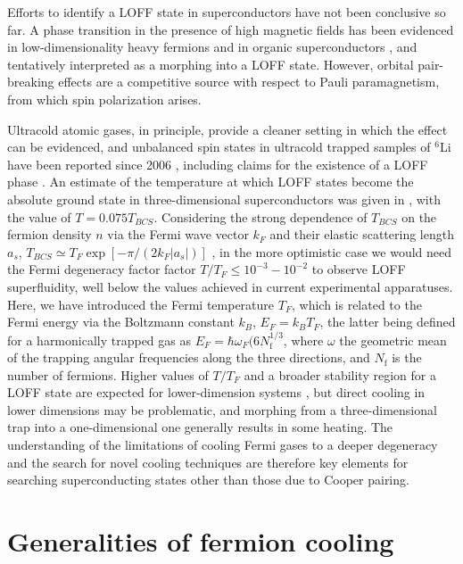 \documentclass[pra,letterpaper,twocolumn,showpacs,superscriptaddress]{revtex4}
\begin{document}
Efforts to identify a LOFF state in superconductors have not been conclusive so far. A phase transition in the presence of high magnetic fields has  
been evidenced in low-dimensionality heavy fermions \cite{Gloos1993,Radovan2003,Kakuyanagi2005} and in organic superconductors 
\cite{Dupuis1995}, and tentatively interpreted as a morphing into a LOFF state. However, orbital pair-breaking effects are a competitive source with respect to Pauli 
paramagnetism, from which spin polarization arises. 

Ultracold atomic gases, in principle, provide a cleaner setting in which the effect can be evidenced, and 
unbalanced spin states in ultracold trapped samples of ${}^6$Li have been reported since 2006 \cite{Zwierlein2006,Partridge2006}, including claims for 
the existence of a LOFF phase \cite{Liao2010}. An estimate of the temperature at which LOFF states become the absolute ground state in 
three-dimensional superconductors was given in \cite{Matsuo1998}, with the value of $T = 0.075 T_{BCS}$. Considering the strong dependence of 
$T_{BCS}$ on the fermion density $n$ via the Fermi wave vector $k_F$ and their elastic scattering length $a_s$, $T_{BCS} \simeq T_F \exp[-\pi/(2k_F|a_s|)]$ 
\cite{Gorkov1961,Stoof1996},  in the more optimistic case we would need the Fermi degeneracy factor factor $T/T_F \leq 10^{-3}-10^{-2}$ to observe LOFF superfluidity, 
well below the values achieved in current experimental apparatuses. Here, we have introduced the Fermi temperature $T_F$, which is related to the Fermi energy 
via the Boltzmann constant $k_B$, $E_F=k_B T_F$, the latter being defined for a harmonically trapped gas as 
$E_F=\hbar \omega_F (6N_\mathrm{f}^{1/3}$, where $\omega$ the geometric mean of the trapping angular frequencies along the three directions, and 
$N_\mathrm{f}$ is the number of fermions. Higher values of $T/T_F$ and a broader stability region for a LOFF state are expected for 
lower-dimension systems \cite{Liu2007,Yanase2009}, but direct cooling in lower dimensions may be problematic, and morphing from a 
three-dimensional trap into a one-dimensional one generally results in some heating. The understanding of the limitations of cooling Fermi gases to a 
deeper degeneracy and the search for novel cooling techniques are therefore key elements for searching superconducting states other than those due to Cooper pairing. 

\section{\bf{Generalities of fermion cooling}}
\end{document}
